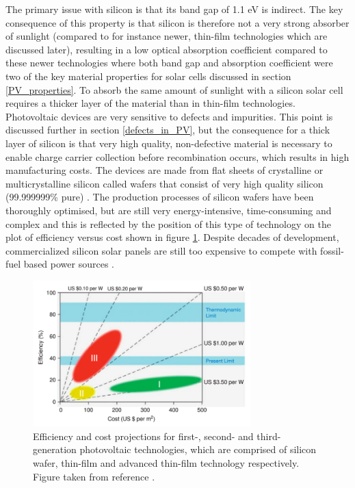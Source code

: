 The primary issue with silicon is that its band gap of 1.1 eV is indirect. The key consequence of this property is that silicon is therefore not a very strong absorber of sunlight (compared to for instance newer, thin-film technologies which are discussed later), resulting in a low optical absorption coefficient  compared to these newer technologies where both band gap and absorption coefficient were two of the key material properties for solar cells discussed in section \ref{PV_properties}. To absorb the same amount of sunlight with a silicon solar cell requires a thicker layer of the material than in thin-film technologies. Photovoltaic devices are very sensitive to defects and impurities. This point is discussed further in section \ref{defects_in_PV}, but the consequence for a thick layer of silicon is that very high quality, non-defective material is necessary to enable charge carrier collection before recombination occurs, which results in high manufacturing costs. The devices are made from flat sheets of crystalline or multicrystalline silicon called wafers that consist of very high quality silicon (99.999999\% pure) 
\cite{sus_book_5}.
The production processes of silicon wafers have been thoroughly optimised, but are still very energy-intensive, time-consuming and complex \cite{emerging_pv} and this is reflected by the position of this type of technology on the plot of efficiency versus cost shown in figure \ref{PV_generations}. Despite decades of development, commercialized silicon solar panels are still too expensive to compete with fossil-fuel based power sources \cite{FE_PV_rev1_5}. \\

\begin{figure}[h!]
  \centering
    \includegraphics[width=0.75\textwidth]{figures/PV_generations.png}
    \caption{Efficiency and cost projections for first-, second- and third-generation photovoltaic technologies, which are comprised of silicon wafer, thin-film and advanced thin-film technology respectively. Figure 
 taken from reference .}
  \label{PV_generations}
\end{figure}

